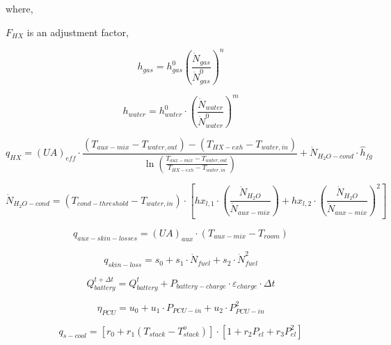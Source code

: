 where,

\(F_{HX}\) is an adjustment factor,

\begin{equation}
h_{gas} = h_{gas}^0 \left( \frac{\dot{N}_{gas}}{\dot{N}_{gas}^0} \right)^n
\end{equation}

\begin{equation}
{h_{water}} = h_{water}^0 \cdot {\left( {\frac{{{{\dot N}_{water}}}}{{\dot N_{water}^0}}} \right)^m}
\end{equation}

\begin{equation}
{q_{HX}} = {\left( {UA} \right)_{eff}} \cdot \frac{{\left( {{T_{aux - mix}} - {T_{water,out}}} \right) - \left( {{T_{HX - exh}} - {T_{water,in}}} \right)}}{{\ln \left( {\frac{{{T_{aux - mix}} - {T_{water,out}}}}{{{T_{HX - exh}} - {T_{water,in}}}}} \right)}} + {\dot N_{{H_2}O - cond}} \cdot {\hat h_{fg}}
\end{equation}

\begin{equation}
{\dot N_{{H_2}O - cond}} = \left( {{T_{cond - threshold}} - {T_{water,in}}} \right) \cdot \left[ {h{x_{l,1}} \cdot \left( {\frac{{{{\dot N}_{{H_2}O}}}}{{{{\dot N}_{aux - mix}}}}} \right) + h{x_{l,2}} \cdot {{\left( {\frac{{{{\dot N}_{{H_2}O}}}}{{{{\dot N}_{aux - mix}}}}} \right)}^2}} \right]
\end{equation}

\begin{equation}
{q_{aux - skin - losses}} = {(UA)_{aux}} \cdot ({T_{aux - mix}} - {T_{room}})
\end{equation}

\begin{equation}
{q_{skin - loss}} = {s_0} + {s_1} \cdot {\dot N_{fuel}} + {s_2} \cdot \dot N_{fuel}^2
\end{equation}

\begin{equation}
Q_{battery}^{t + \Delta t} = Q_{battery}^t + {P_{battery - charge}} \cdot {\varepsilon_{charge}} \cdot \Delta t
\end{equation}

\begin{equation}
{\eta_{PCU}} = {u_0} + {u_1} \cdot {P_{PCU - in}} + {u_2} \cdot P_{PCU - in}^2
\end{equation}

\begin{equation}
{q_{s - cool}} = \left[ {{r_0} + {r_1}\left( {{T_{stack}} - T_{stack}^o} \right)} \right] \cdot \left[ {1 + {r_2}{P_{el}} + {r_3}P_{el}^2} \right]
\end{equation}

